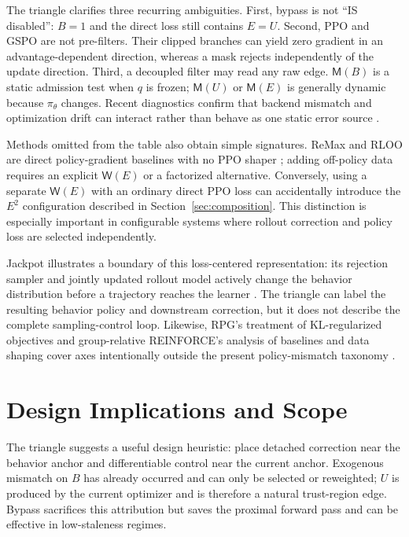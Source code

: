 \documentclass[10pt,twocolumn]{article}
\newcommand{\prox}{q}
\newcommand{\cur}{\pi_\theta}
\newcommand{\B}{B}
\newcommand{\U}{U}
\newcommand{\E}{E}
\newcommand{\Mask}{\mathsf{M}}
\newcommand{\Weight}{\mathsf{W}}
\begin{document}
The triangle clarifies three recurring ambiguities.  First, bypass is not ``IS disabled'': \(\B=1\) and the direct loss still contains \(\E=\U\).  Second, PPO and GSPO are not pre-filters.  Their clipped branches can yield zero gradient in an advantage-dependent direction, whereas a mask rejects independently of the update direction.  Third, a decoupled filter may read any raw edge.  \(\Mask(\B)\) is a static admission test when \(\prox\) is frozen; \(\Mask(\U)\) or \(\Mask(\E)\) is generally dynamic because \(\cur\) changes.  Recent diagnostics confirm that backend mismatch and optimization drift can interact rather than behave as one static error source \citep{zhong2026tim,zhang2026beyondprecision,zhao2026estr}.

Methods omitted from the table also obtain simple signatures.  ReMax and RLOO are direct policy-gradient baselines with no PPO shaper \citep{li2023remax,ahmadian2024rloo}; adding off-policy data requires an explicit \(\Weight(\E)\) or a factorized alternative.  Conversely, using a separate \(\Weight(\E)\) with an ordinary direct PPO loss can accidentally introduce the \(\E^2\) configuration described in Section~\ref{sec:composition}.  This distinction is especially important in configurable systems where rollout correction and policy loss are selected independently.

Jackpot illustrates a boundary of this loss-centered representation: its rejection sampler and jointly updated rollout model actively change the behavior distribution before a trajectory reaches the learner \citep{chen2026jackpot}.  The triangle can label the resulting behavior policy and downstream correction, but it does not describe the complete sampling-control loop.  Likewise, RPG's treatment of KL-regularized objectives and group-relative REINFORCE's analysis of baselines and data shaping cover axes intentionally outside the present policy-mismatch taxonomy \citep{zhang2025rpg,yao2025offpolicy}.

\section{Design Implications and Scope}
\label{sec:design}

The triangle suggests a useful design heuristic: place detached correction near the behavior anchor and differentiable control near the current anchor.  Exogenous mismatch on \(\B\) has already occurred and can only be selected or reweighted; \(\U\) is produced by the current optimizer and is therefore a natural trust-region edge.  Bypass sacrifices this attribution but saves the proximal forward pass and can be effective in low-staleness regimes.
\end{document}
